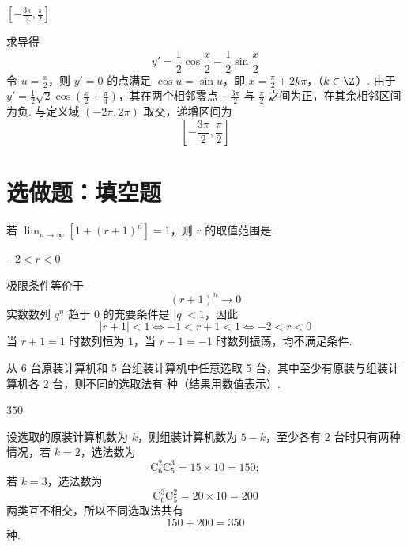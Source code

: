 \documentclass[UTF8,a4paper,oneside,11pt]{ctexbook}
\begin{document}
\begin{answer}
\(\left[-\frac{3\pi}{2},\frac{\pi}{2}\right]\)
\end{answer}

\begin{solution}
求导得
\[
y'=\frac12\cos\frac{x}{2}-\frac12\sin\frac{x}{2}
\]
令 \(u=\frac{x}{2}\)，则 \(y'=0\) 的点满足 \(\cos u=\sin u\)，即
\(x=\frac{\pi}{2}+2k\pi\)，（\(k\in\Z\)）.
由于 \(y'=\frac12\sqrt2\cos\left(\frac{x}{2}+\frac{\pi}{4}\right)\)，其在两个相邻零点 \(-\frac{3\pi}{2}\) 与 \(\frac{\pi}{2}\) 之间为正，在其余相邻区间为负. 与定义域 \((-2\pi,2\pi)\) 取交，递增区间为
\[
\left[-\frac{3\pi}{2},\frac{\pi}{2}\right]
\]
\end{solution}

\section{选做题：填空题}

\begin{problem}[A]
若 \(\displaystyle\lim_{n\to\infty}\left[1+(r+1)^n\right]=1\)，则 \(r\) 的取值范围是\fillinblank{}.
\end{problem}

\begin{answer}
\(-2<r<0\)
\end{answer}

\begin{solution}
极限条件等价于
\[
(r+1)^n\longrightarrow0
\]
实数数列 \(q^n\) 趋于 \(0\) 的充要条件是 \(|q|<1\)，因此
\[
|r+1|<1
\iff -1<r+1<1
\iff -2<r<0
\]
当 \(r+1=1\) 时数列恒为 \(1\)，当 \(r+1=-1\) 时数列振荡，均不满足条件.
\end{solution}

\begin{problem}[A]
从 6 台原装计算机和 5 台组装计算机中任意选取 5 台，其中至少有原装与组装计算机各 2 台，则不同的选取法有\fillinblank{} 种（结果用数值表示）.
\end{problem}

\begin{answer}
\(350\)
\end{answer}

\begin{solution}
设选取的原装计算机数为 \(k\)，则组装计算机数为 \(5-k\)，至少各有 \(2\) 台时只有两种情况，若 \(k=2\)，选法数为
\[
\mathrm C_6^2\mathrm C_5^3=15\times10=150;
\]
若 \(k=3\)，选法数为
\[
\mathrm C_6^3\mathrm C_5^2=20\times10=200
\]
两类互不相交，所以不同选取法共有
\[
150+200=350
\]
种.
\end{solution}
\end{document}
